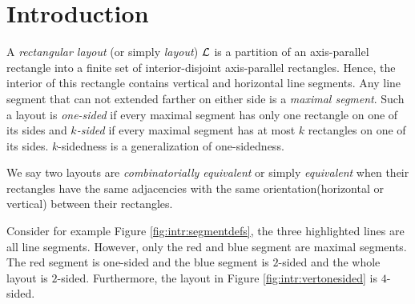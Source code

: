 
\section{Introduction}
\thispagestyle{plain}

  A  \emph{rectangular layout} (or simply \emph{layout}) $\mathcal{L}$ is a partition of an axis-parallel rectangle into a finite set of interior-disjoint axis-parallel rectangles.
  Hence, the interior of this rectangle contains vertical and horizontal line segments.
  Any line segment that can not extended farther on either side is a \emph{maximal segment}.
  Such a layout is \emph{one-sided} if every maximal segment has only one rectangle on one of its sides and \emph{$k$-sided} if every maximal segment has at most $k$ rectangles on one of its sides. $k$-sidedness is a generalization of one-sidedness.

  We say two layouts are  \emph{combinatorially equivalent} or simply \emph{equivalent} when their rectangles have the same adjacencies with the same orientation(horizontal or vertical) between their rectangles. 

  Consider for example Figure \ref{fig:intr:segmentdefs}, the three highlighted lines are all line segments. However, only the red and blue segment are maximal segments. The red segment is one-sided and the blue segment is $2$-sided and the whole layout is $2$-sided. Furthermore, the layout in Figure \ref{fig:intr:vertonesided} is $4$-sided.

